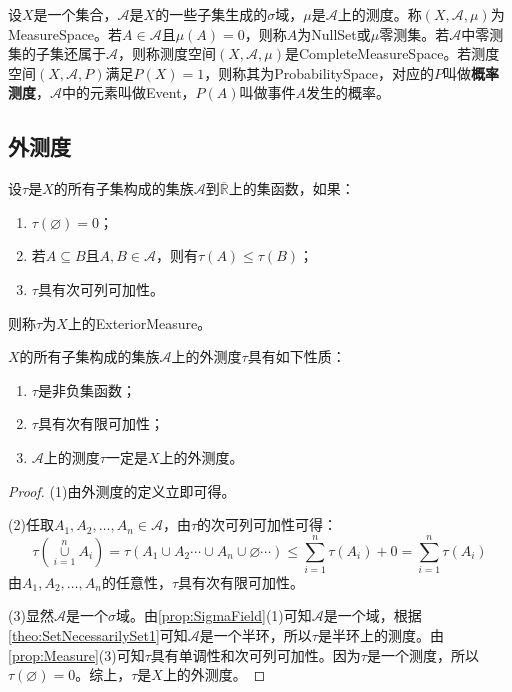 \begin{definition}
	设$X$是一个集合，$\mathscr{A}$是$X$的一些子集生成的$\sigma$域，$\mu$是$\mathscr{A}$上的测度。称$(X,\mathscr{A},\mu)$为\gls{MeasureSpace}。若$A\in \mathscr{A}$且$\mu(A)=0$，则称$A$为\gls{NullSet}或$\mu$零测集。若$\mathscr{A}$中零测集的子集还属于$\mathscr{A}$，则称测度空间$(X,\mathscr{A},\mu)$是\gls{CompleteMeasureSpace}。若测度空间$(X,\mathscr{A},P)$满足$P(X)=1$，则称其为\gls{ProbabilitySpace}，对应的$P$叫做\textbf{概率测度}，$\mathscr{A}$中的元素叫做\gls{Event}，$P(A)$叫做事件$A$发生的概率。
\end{definition}

\subsection{外测度}
\begin{definition}
	设$\tau$是$X$的所有子集构成的集族$\mathscr{A}$到$\overline{\mathbb{R}}$上的集函数，如果：
	\begin{enumerate}
		\item $\tau(\varnothing)=0$；
		\item 若$A\subseteq B$且$A,B\in\mathscr{A}$，则有$\tau(A)\leqslant\tau(B)$；
		\item $\tau$具有次可列可加性。
	\end{enumerate}
	则称$\tau$为$X$上的\gls{ExteriorMeasure}。
\end{definition}
\begin{property}\label{prop:ExteriorMeasure}
	$X$的所有子集构成的集族$\mathscr{A}$上的外测度$\tau$具有如下性质：
	\begin{enumerate}
		\item $\tau$是非负集函数；
		\item $\tau$具有次有限可加性；
		\item $\mathscr{A}$上的测度$\tau$一定是$X$上的外测度。
	\end{enumerate}
\end{property}
\begin{proof}
	(1)由外测度的定义立即可得。\par
	(2)任取$A_1,A_2,\dots,A_n\in\mathscr{A}$，由$\tau$的次可列可加性可得：
	\begin{equation*}
		\tau\left(\underset{i=1}{\overset{n}{\cup}}A_i\right)=\tau(A_1\cup A_2\cdots\cup A_n\cup\varnothing\cdots)\leqslant\sum_{i=1}^{n}\tau(A_i)+0=\sum_{i=1}^{n}\tau(A_i)
	\end{equation*}
	由$A_1,A_2,\dots,A_n$的任意性，$\tau$具有次有限可加性。\par
	(3)显然$\mathscr{A}$是一个$\sigma$域。由\cref{prop:SigmaField}(1)可知$\mathscr{A}$是一个域，根据\cref{theo:SetNecessarilySet1}可知$\mathscr{A}$是一个半环，所以$\tau$是半环上的测度。由\cref{prop:Measure}(3)可知$\tau$具有单调性和次可列可加性。因为$\tau$是一个测度，所以$\tau(\varnothing)=0$。综上，$\tau$是$X$上的外测度。
\end{proof}
